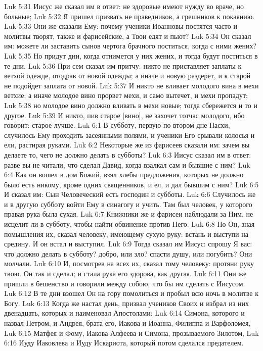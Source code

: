 Luk 5:31  Иисус же сказал им в ответ: не здоровые имеют нужду во враче, но больные;
Luk 5:32  Я пришел призвать не праведников, а грешников к покаянию.
Luk 5:33  Они же сказали Ему: почему ученики Иоанновы постятся часто и молитвы творят, также и фарисейские, а Твои едят и пьют?
Luk 5:34  Он сказал им: можете ли заставить сынов чертога брачного поститься, когда с ними жених?
Luk 5:35  Но придут дни, когда отнимется у них жених, и тогда будут поститься в те дни.
Luk 5:36  При сем сказал им притчу: никто не приставляет заплаты к ветхой одежде, отодрав от новой одежды; а иначе и новую раздерет, и к старой не подойдет заплата от новой.
Luk 5:37  И никто не вливает молодого вина в мехи ветхие; а иначе молодое вино прорвет мехи, и само вытечет, и мехи пропадут;
Luk 5:38  но молодое вино должно вливать в мехи новые; тогда сбережется и то и другое.
Luk 5:39  И никто, пив старое [вино], не захочет тотчас молодого, ибо говорит: старое лучше.
Luk 6:1  В субботу, первую по втором дне Пасхи, случилось Ему проходить засеянными полями, и ученики Его срывали колосья и ели, растирая руками.
Luk 6:2  Некоторые же из фарисеев сказали им: зачем вы делаете то, чего не должно делать в субботы?
Luk 6:3  Иисус сказал им в ответ: разве вы не читали, что сделал Давид, когда взалкал сам и бывшие с ним?
Luk 6:4  Как он вошел в дом Божий, взял хлебы предложения, которых не должно было есть никому, кроме одних священников, и ел, и дал бывшим с ним?
Luk 6:5  И сказал им: Сын Человеческий есть господин и субботы.
Luk 6:6  Случилось же и в другую субботу войти Ему в синагогу и учить. Там был человек, у которого правая рука была сухая.
Luk 6:7  Книжники же и фарисеи наблюдали за Ним, не исцелит ли в субботу, чтобы найти обвинение против Него.
Luk 6:8  Но Он, зная помышления их, сказал человеку, имеющему сухую руку: встань и выступи на средину. И он встал и выступил.
Luk 6:9  Тогда сказал им Иисус: спрошу Я вас: что должно делать в субботу? добро, или зло? спасти душу, или погубить? Они молчали.
Luk 6:10  И, посмотрев на всех их, сказал тому человеку: протяни руку твою. Он так и сделал; и стала рука его здорова, как другая.
Luk 6:11  Они же пришли в бешенство и говорили между собою, что бы им сделать с Иисусом.
Luk 6:12  В те дни взошел Он на гору помолиться и пробыл всю ночь в молитве к Богу.
Luk 6:13  Когда же настал день, призвал учеников Своих и избрал из них двенадцать, которых и наименовал Апостолами:
Luk 6:14  Симона, которого и назвал Петром, и Андрея, брата его, Иакова и Иоанна, Филиппа и Варфоломея,
Luk 6:15  Матфея и Фому, Иакова Алфеева и Симона, прозываемого Зилотом,
Luk 6:16  Иуду Иаковлева и Иуду Искариота, который потом сделался предателем.
